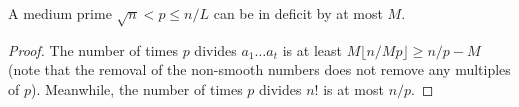 \begin{sublemma}
\label{initial-factorization-medium-prime-ge}
\leanok
A medium prime $\sqrt{n} < p ≤ n/L$ can be in deficit by at most $M$.
\end{sublemma}
\begin{proof}
\leanok
The number of times $p$ divides $a_1 \dots a_t$ is at least $M \lfloor n/Mp
  \rfloor ≥ n/p - M$ (note that the removal of the non-smooth numbers
  does not remove any multiples
  of $p$).  Meanwhile, the number of times $p$ divides $n!$ is at most $n/p$.
\end{proof}
